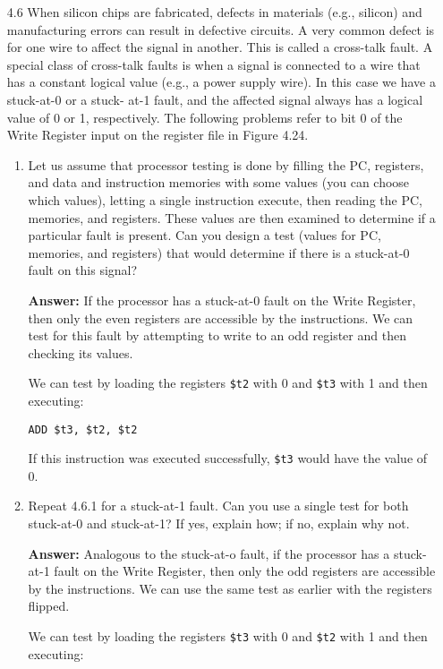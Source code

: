 \documentclass[12pt]{article}
\begin{document}
\begin{enumerate}
  \item[4.6] When silicon chips are fabricated, defects in materials (e.g., silicon) and manufacturing errors can result in defective circuits. A very common defect is for one wire to affect the signal in another. This is called a cross-talk fault. A special class of cross-talk faults is when a signal is connected to a wire that has a constant logical value (e.g., a power supply wire). In this case we have a stuck-at-0 or a stuck- at-1 fault, and the affected signal always has a logical value of 0 or 1, respectively. The following problems refer to bit 0 of the Write Register input on the register file in Figure 4.24.

  \begin{enumerate}[label=4.6.\arabic*]

    \item Let us assume that processor testing is done by filling the PC, registers, and data and instruction memories with some values (you can choose which values), letting a single instruction execute, then reading the PC, memories, and registers. These values are then examined to determine if a particular fault is present. Can you design a test (values for PC, memories, and registers) that would determine if there is a stuck-at-0 fault on this signal?

    \textbf{Answer:} If the processor has a stuck-at-0 fault on the Write Register, then only the even registers are accessible by the instructions. We can test for this fault by attempting to write to an odd register and then checking its values.

    We can test by loading the registers \texttt{\$t2} with 0 and \texttt{\$t3} with 1 and then executing:

    \texttt{ADD \$t3, \$t2, \$t2}

    If this instruction was executed successfully, \texttt{\$t3} would have the value of 0.

    \item Repeat 4.6.1 for a stuck-at-1 fault. Can you use a single test for both stuck-at-0 and stuck-at-1? If yes, explain how; if no, explain why not.

    \textbf{Answer:} Analogous to the stuck-at-o fault, if the processor has a stuck-at-1 fault on the Write Register, then only the odd registers are accessible by the instructions. We can use the same test as earlier with the registers flipped.

    We can test by loading the registers \texttt{\$t3} with 0 and \texttt{\$t2} with 1 and then executing:


\end{enumerate}
\end{enumerate}
\end{document}
